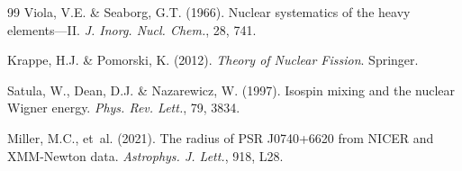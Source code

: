 \documentclass[letterpaper,11pt]{article}
\begin{document}
\begin{thebibliography}{99}
 Viola, V.E. \& Seaborg, G.T. (1966).
Nuclear systematics of the heavy elements---II. \textit{J. Inorg. Nucl. Chem.}, 28, 741.

 Krappe, H.J. \& Pomorski, K. (2012).
\textit{Theory of Nuclear Fission}. Springer.

 Satula, W., Dean, D.J. \& Nazarewicz, W. (1997).
Isospin mixing and the nuclear Wigner energy. \textit{Phys. Rev. Lett.}, 79, 3834.

 Miller, M.C., et~al. (2021).
The radius of PSR J0740+6620 from NICER and XMM-Newton data. \textit{Astrophys. J. Lett.}, 918, L28.
\end{thebibliography}
\end{document}
